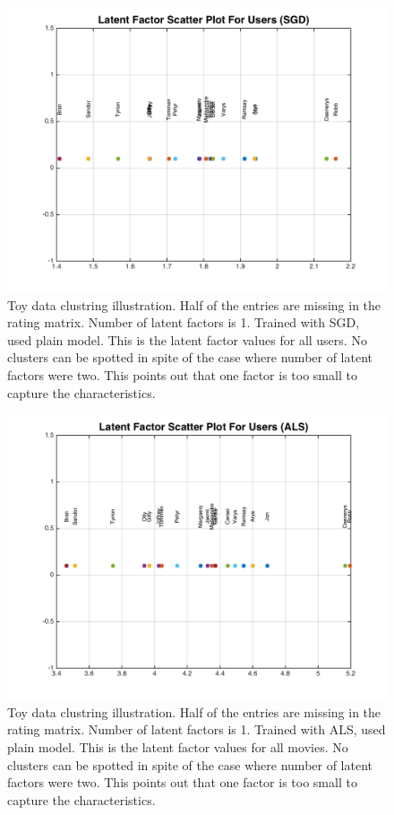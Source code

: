 \documentclass[11pt]{article}
\begin{document}
	\begin{figure}[H]
		\centering		
		\includegraphics[width=\wi]{buff3/3}
		\caption{Toy data clustring illustration. Half of the entries are missing in the rating matrix. Number of latent factors is 1. Trained with SGD, used plain model. This is the latent factor values for all users. No clusters can be spotted in spite of the case where number of latent factors were two. This points out that one factor is too small to capture the characteristics.}
		\label{5}		
	\end{figure}						
	\begin{figure}[H]
		\centering		
		\includegraphics[width=\wi]{buff3/4}
		\caption{Toy data clustring illustration. Half of the entries are missing in the rating matrix. Number of latent factors is 1. Trained with ALS, used plain model. This is the latent factor values for all movies. No clusters can be spotted in spite of the case where number of latent factors were two. This points out that one factor is too small to capture the characteristics.}
		\label{5}		
	\end{figure}
\end{document}
